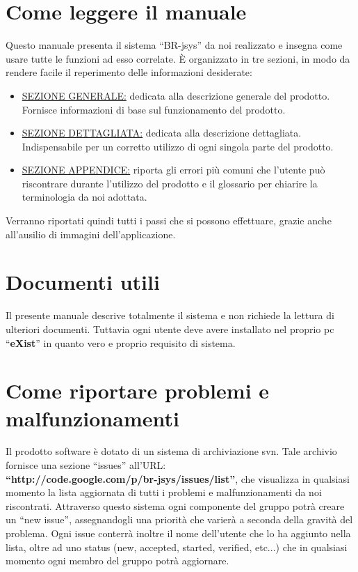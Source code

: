 \section{Come leggere il manuale}
Questo manuale presenta il sistema ``BR-jsys'' da noi realizzato e insegna come usare tutte le funzioni ad esso correlate. \`E organizzato in tre sezioni, in modo da rendere facile il reperimento delle informazioni desiderate:
\begin{itemize}
\item \underline{SEZIONE GENERALE:} dedicata alla descrizione generale del prodotto. Fornisce informazioni di base sul funzionamento del prodotto.
\item \underline{SEZIONE DETTAGLIATA:} dedicata alla descrizione dettagliata. Indispensabile per un corretto utilizzo di ogni singola parte del prodotto.
\item \underline{SEZIONE APPENDICE:} riporta gli errori pi\`u comuni che l'utente pu\`o riscontrare durante l'utilizzo del prodotto e il glossario per chiarire la terminologia da noi adottata.
\end{itemize}
Verranno riportati quindi tutti i passi che si possono effettuare, grazie anche all'ausilio di immagini dell'applicazione.
\section{Documenti utili}
Il presente manuale descrive totalmente il sistema e non richiede la lettura di ulteriori documenti. Tuttavia ogni utente deve avere installato nel proprio pc ``\textbf{eXist}'' in quanto vero e proprio requisito di sistema. 
\section{Come riportare problemi e malfunzionamenti}
Il prodotto software \`e dotato di un sistema di archiviazione svn. Tale archivio fornisce una sezione ``issues'' all'URL: \\ 
\textbf{``http://code.google.com/p/br-jsys/issues/list''}, che visualizza in qualsiasi momento la lista aggiornata di tutti i problemi e malfunzionamenti da noi riscontrati. Attraverso questo sistema ogni componente del gruppo potr\`a creare un ``new issue'', assegnandogli una priorit\`a che varier\`a a seconda della gravit\`a del problema. Ogni issue conterr\`a inoltre il nome dell'utente che lo ha aggiunto nella lista, oltre ad uno status (new, accepted, started, verified, etc...) che in qualsiasi momento ogni membro del gruppo potr\`a aggiornare. 

